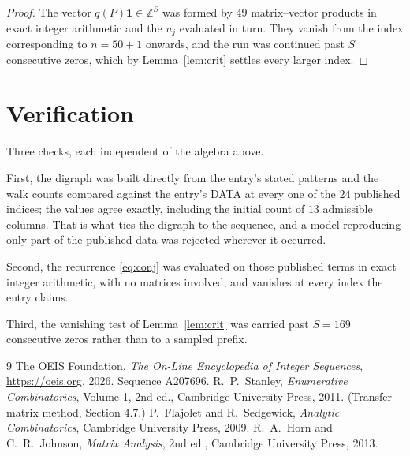 \documentclass[11pt,a4paper]{article}
\theoremstyle{plain}
\theoremstyle{definition}
\begin{document}
\begin{proof}
The vector $q(P)\mathbf{1}\in\mathbb{Z}^{S}$ was formed by $49$ matrix--vector
products in exact integer arithmetic and the $u_j$ evaluated in turn. They vanish from the
index corresponding to $n=50+1$ onwards, and the run was continued past $S$ consecutive
zeros, which by Lemma~\ref{lem:crit} settles every larger index.
\end{proof}

\section{Verification}

Three checks, each independent of the algebra above.

First, the digraph was built directly from the entry's stated patterns and the walk counts
compared against the entry's DATA at every one of the $24$ published indices; the
values agree exactly, including the initial count of $13$ admissible columns. That is
what ties the digraph to the sequence, and a model reproducing only part of the published
data was rejected wherever it occurred.

Second, the recurrence \eqref{eq:conj} was evaluated on those published terms in exact
integer arithmetic, with no matrices involved, and vanishes at every index the entry claims.

Third, the vanishing test of Lemma~\ref{lem:crit} was carried past $S=169$ consecutive
zeros rather than to a sampled prefix.

\begin{thebibliography}{9}
 The OEIS Foundation, \emph{The On-Line Encyclopedia of Integer
Sequences}, \url{https://oeis.org}, 2026. Sequence A207696.
 R.~P.~Stanley, \emph{Enumerative Combinatorics}, Volume 1, 2nd ed.,
Cambridge University Press, 2011. (Transfer-matrix method, Section 4.7.)
 P.~Flajolet and R.~Sedgewick, \emph{Analytic Combinatorics}, Cambridge
University Press, 2009.
 R.~A.~Horn and C.~R.~Johnson, \emph{Matrix Analysis}, 2nd ed., Cambridge
University Press, 2013.
\end{thebibliography}
\end{document}
